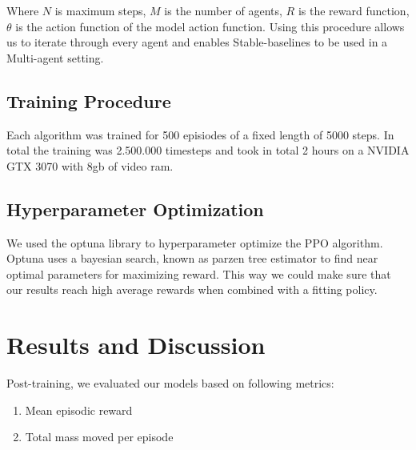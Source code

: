 \documentclass[conference]{IEEEtran}
\begin{document}
\begin{algorithm}[h!]
\end{algorithm}

Where $N$ is maximum steps, $M$ is the number of agents, $R$ is the reward function, $\theta$ is the action function of the model action function.
Using this procedure allows us to iterate through every agent and enables Stable-baselines to be used in a Multi-agent setting.


\subsection{Training Procedure}
Each algorithm was trained for 500 episiodes of a fixed length of 5000 steps. In total the training was
2.500.000 timesteps and took in total 2 hours on a NVIDIA GTX 3070 with 8gb of video ram.


\subsection{Hyperparameter Optimization}
We used the optuna library to hyperparameter optimize the PPO algorithm. Optuna uses a bayesian
search, known as parzen tree estimator to find near optimal parameters for maximizing reward. This way we could make sure that our results reach high
average rewards when combined with a fitting policy.



\section{Results and Discussion}
Post-training, we evaluated our models based on following metrics:

\begin{enumerate}
	\item Mean episodic reward
	\item Total mass moved per episode
\end{enumerate}
\end{document}
